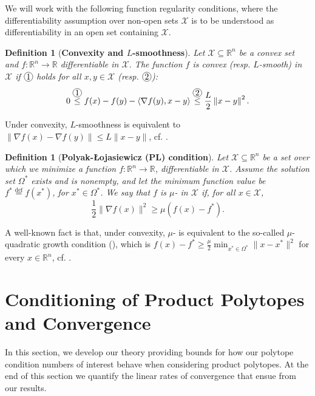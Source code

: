 \documentclass[twoside]{article}
\newcommand{\R}{\mathbb{R}}
\newcommand{\mX}{\mathcal{X}}
\newcommand{\innp}[1]{\left\langle #1 \right\rangle}
\newcommand{\norm}[1]{\| #1 \|}
\newcommand{\defi}{\stackrel{\mathrm{\scriptscriptstyle def}}{=}}
\newtheorem{definition}[theorem]{Definition}
\begin{document}
We will work with the following function regularity conditions, where the differentiability assumption over non-open sets $\mX$ is to be understood as differentiability in an open set containing $\mX$.


\begin{definition}[\textbf{Convexity and $L$-smoothness}]\label{def:conv_smooth}
    Let $\mX \subseteq \R^n$ be a convex set and $f : \R^n \rightarrow \R$ differentiable in $\mX$. The function $f$ is convex (resp. $L$-smooth) in $\mX$ if $\circled{1}$ holds for all $x, y \in \mX$ (resp. $\circled{2}$):
\[
    0 \circled{1}[\leq] f(x) -  f(y) - \innp{\nabla f(y), x - y} \circled{2}[\leq] \frac{L}{2}\left\| x - y\right\|^2.
    \vspace{0.3cm}
\] 
\end{definition}
Under convexity, $L$-smoothness is equivalent to $\|\nabla f(x) - \nabla f(y)\| \le L\|x - y\|$, cf. \citep{Bec17}.
    
\begin{definition}[\textbf{Polyak-Łojasiewicz (PL) condition}]
\label{def:pl}
Let $\mX \subseteq \R^n$ be a set over which we minimize a function $f : \R^n \rightarrow \R$, differentiable in $\mX$.
Assume the solution set $\Omega^\ast$ exists and is nonempty, and let the minimum function value be $f^\ast \defi f(x^\ast)$, for $x^\ast \in \Omega^\ast$.
We say that $f$ is $\mu$-\PL{} in $\mX$ if, for all $x \in \mX$, 
\[
\frac{1}{2} \|\nabla f(x)\|^2 \geq \mu (f(x) - f^\ast).
\] 
\end{definition}

A well-known fact is that, under convexity, $\mu$-\PL{} is equivalent to the so-called $\mu$-quadratic growth condition (), which is $f(x) - f^\ast \geq \frac{\mu}{2}\min_{x^\ast\in\Omega^\ast }\norm{x-x^\ast}^2$ for every $x\in \R^n$, cf. \citep{KNS16}.


\section{Conditioning of Product Polytopes and Convergence}\label{s:conditioning_convergence}
In this section, we develop our theory providing bounds for how our polytope condition numbers of interest behave when considering product polytopes. At the end of this section we quantify the linear rates of convergence that ensue from our results.
\end{document}
